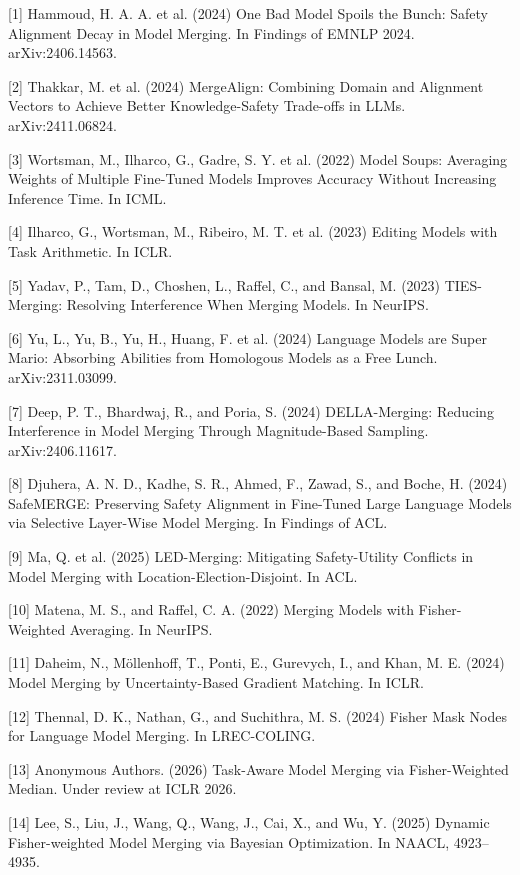 \documentclass{article}
\begin{document}
{
\small
[1] Hammoud, H. A. A. et al. (2024) One Bad Model Spoils the Bunch: Safety Alignment Decay in Model Merging. In Findings of EMNLP 2024. arXiv:2406.14563.

[2] Thakkar, M. et al. (2024) MergeAlign: Combining Domain and Alignment Vectors to Achieve Better Knowledge-Safety Trade-offs in LLMs. arXiv:2411.06824.

[3] Wortsman, M., Ilharco, G., Gadre, S. Y. et al. (2022) Model Soups: Averaging Weights of Multiple Fine-Tuned Models Improves Accuracy Without Increasing Inference Time. In ICML.

[4] Ilharco, G., Wortsman, M., Ribeiro, M. T. et al. (2023) Editing Models with Task Arithmetic. In ICLR.

[5] Yadav, P., Tam, D., Choshen, L., Raffel, C., and Bansal, M. (2023) TIES-Merging: Resolving Interference When Merging Models. In NeurIPS.

[6] Yu, L., Yu, B., Yu, H., Huang, F. et al. (2024) Language Models are Super Mario: Absorbing Abilities from Homologous Models as a Free Lunch. arXiv:2311.03099.

[7] Deep, P. T., Bhardwaj, R., and Poria, S. (2024) DELLA-Merging: Reducing Interference in Model Merging Through Magnitude-Based Sampling. arXiv:2406.11617.

[8] Djuhera, A. N. D., Kadhe, S. R., Ahmed, F., Zawad, S., and Boche, H. (2024) SafeMERGE: Preserving Safety Alignment in Fine-Tuned Large Language Models via Selective Layer-Wise Model Merging. In Findings of ACL.

[9] Ma, Q. et al. (2025) LED-Merging: Mitigating Safety-Utility Conflicts in Model Merging with Location-Election-Disjoint. In ACL.

[10] Matena, M. S., and Raffel, C. A. (2022) Merging Models with Fisher-Weighted Averaging. In NeurIPS.

[11] Daheim, N., Möllenhoff, T., Ponti, E., Gurevych, I., and Khan, M. E. (2024) Model Merging by Uncertainty-Based Gradient Matching. In ICLR.

[12] Thennal, D. K., Nathan, G., and Suchithra, M. S. (2024) Fisher Mask Nodes for Language Model Merging. In LREC-COLING.

[13] Anonymous Authors. (2026) Task-Aware Model Merging via Fisher-Weighted Median. Under review at ICLR 2026.

[14] Lee, S., Liu, J., Wang, Q., Wang, J., Cai, X., and Wu, Y. (2025) Dynamic Fisher-weighted Model Merging via Bayesian Optimization. In NAACL, 4923–4935.

}
\end{document}
